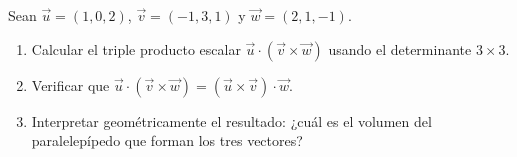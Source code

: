 Sean $\vec{u} = (1, 0, 2)$, $\vec{v} = (-1, 3, 1)$ y $\vec{w} = (2, 1, -1)$.
\begin{enumerate}
    \item Calcular el triple producto escalar $\vec{u} \cdot (\vec{v} \times \vec{w})$ usando el determinante $3\times 3$.
    \item Verificar que $\vec{u} \cdot (\vec{v} \times \vec{w}) = (\vec{u} \times \vec{v}) \cdot \vec{w}$.
    \item Interpretar geométricamente el resultado: ¿cuál es el volumen del paralelepípedo que forman los tres vectores?
\end{enumerate}